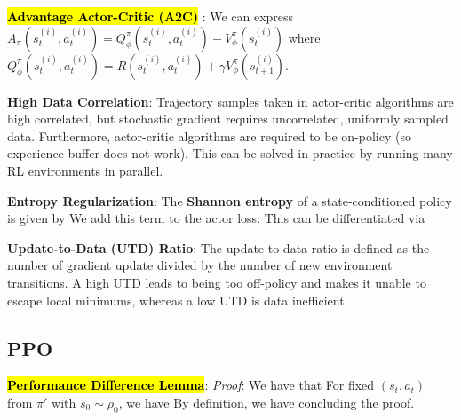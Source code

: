 \documentclass{article}
\begin{document}
  \hl{\textbf{Advantage Actor-Critic (A2C)}} \cite{mnih2016asynchronous}: We can express $A_\pi(s_t^{(i)},a_t^{(i)})=Q_\phi^\pi(s_t^{(i)},a_t^{(i)})-V_\phi^\pi(s_t^{(i)})$ where $Q_\phi^\pi(s_t^{(i)},a_t^{(i)})=R(s_t^{(i)},a_t^{(i)})+\gamma V_\phi^\pi(s_{t+1}^{(i)})$. 

  \textbf{High Data Correlation}: Trajectory samples taken in actor-critic algorithms are high correlated, but stochastic gradient requires uncorrelated, uniformly sampled data. Furthermore, actor-critic algorithms are required to be on-policy (so experience buffer does not work). This can be solved in practice by running many RL environments in parallel. 

  \textbf{Entropy Regularization}: The \textbf{Shannon entropy} of a state-conditioned policy is given by
  We add this term to the actor loss:
  This can be differentiated via

  \textbf{Update-to-Data (UTD) Ratio}: The update-to-data ratio is defined as the number of gradient update divided by the number of new environment transitions. A high UTD leads to being too off-policy and makes it unable to escape local minimums, whereas a low UTD is data inefficient. 

\subsection{PPO}

  \hl{\textbf{Performance Difference Lemma}}: 
  \textit{Proof}: We have that
  For fixed $(s_t,a_t)$ from $\pi'$ with $s_0\sim \rho_0$, we have
  By definition, we have
  concluding the proof. 
\end{document}
